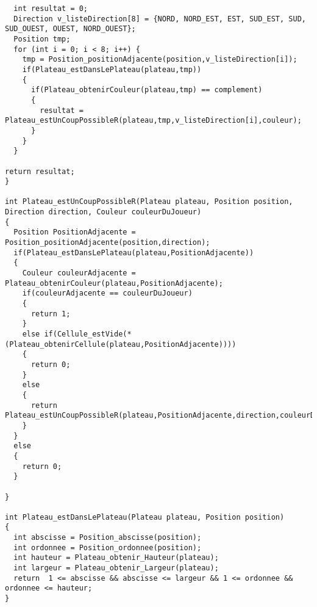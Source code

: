 \begin{lstlisting}
  int resultat = 0;
  Direction v_listeDirection[8] = {NORD, NORD_EST, EST, SUD_EST, SUD, SUD_OUEST, OUEST, NORD_OUEST};
  Position tmp;
  for (int i = 0; i < 8; i++) {
    tmp = Position_positionAdjacente(position,v_listeDirection[i]);
    if(Plateau_estDansLePlateau(plateau,tmp))
    {
      if(Plateau_obtenirCouleur(plateau,tmp) == complement)
      {
        resultat = Plateau_estUnCoupPossibleR(plateau,tmp,v_listeDirection[i],couleur);
      }
    }
  }

return resultat;
}

int Plateau_estUnCoupPossibleR(Plateau plateau, Position position, Direction direction, Couleur couleurDuJoueur)
{
  Position PositionAdjacente = Position_positionAdjacente(position,direction);
  if(Plateau_estDansLePlateau(plateau,PositionAdjacente))
  {
    Couleur couleurAdjacente = Plateau_obtenirCouleur(plateau,PositionAdjacente);
    if(couleurAdjacente == couleurDuJoueur)
    {
      return 1;
    }
    else if(Cellule_estVide(*(Plateau_obtenirCellule(plateau,PositionAdjacente))))
    {
      return 0;
    }
    else
    {
      return Plateau_estUnCoupPossibleR(plateau,PositionAdjacente,direction,couleurDuJoueur);
    }
  }
  else
  {
    return 0;
  }

}

int Plateau_estDansLePlateau(Plateau plateau, Position position)
{
  int abscisse = Position_abscisse(position);
  int ordonnee = Position_ordonnee(position);
  int hauteur = Plateau_obtenir_Hauteur(plateau);
  int largeur = Plateau_obtenir_Largeur(plateau);
  return  1 <= abscisse && abscisse <= largeur && 1 <= ordonnee && ordonnee <= hauteur;
}
\end{lstlisting}
 
